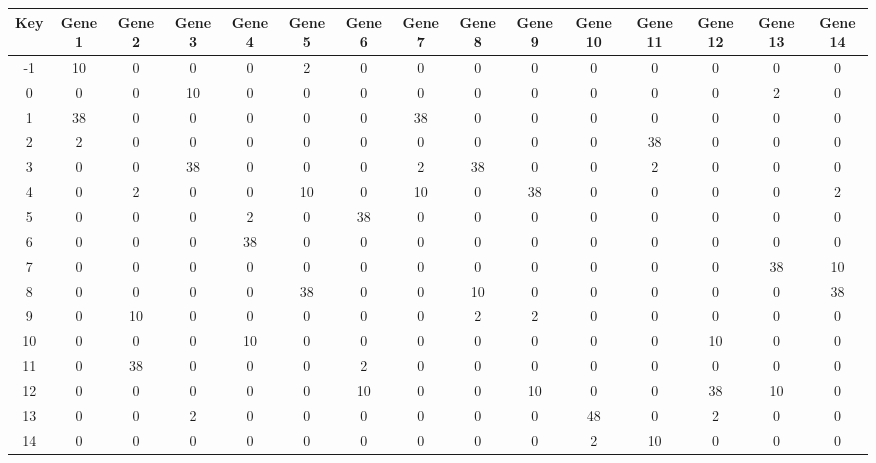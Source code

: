 \begin{tabular}{|c|c|c|c|c|c|c|c|c|c|c|c|c|c|c|}
\hline
Key & Gene 1 & Gene 2 & Gene 3 & Gene 4 & Gene 5 & Gene 6 & Gene 7 & Gene 8 & Gene 9 & Gene 10 & Gene 11 & Gene 12 & Gene 13 & Gene 14 \\
\hline
-1 & 10 & 0 & 0 & 0 & 2 & 0 & 0 & 0 & 0 & 0 & 0 & 0 & 0 & 0 \\
0 & 0 & 0 & 10 & 0 & 0 & 0 & 0 & 0 & 0 & 0 & 0 & 0 & 2 & 0 \\
1 & 38 & 0 & 0 & 0 & 0 & 0 & 38 & 0 & 0 & 0 & 0 & 0 & 0 & 0 \\
2 & 2 & 0 & 0 & 0 & 0 & 0 & 0 & 0 & 0 & 0 & 38 & 0 & 0 & 0 \\
3 & 0 & 0 & 38 & 0 & 0 & 0 & 2 & 38 & 0 & 0 & 2 & 0 & 0 & 0 \\
4 & 0 & 2 & 0 & 0 & 10 & 0 & 10 & 0 & 38 & 0 & 0 & 0 & 0 & 2 \\
5 & 0 & 0 & 0 & 2 & 0 & 38 & 0 & 0 & 0 & 0 & 0 & 0 & 0 & 0 \\
6 & 0 & 0 & 0 & 38 & 0 & 0 & 0 & 0 & 0 & 0 & 0 & 0 & 0 & 0 \\
7 & 0 & 0 & 0 & 0 & 0 & 0 & 0 & 0 & 0 & 0 & 0 & 0 & 38 & 10 \\
8 & 0 & 0 & 0 & 0 & 38 & 0 & 0 & 10 & 0 & 0 & 0 & 0 & 0 & 38 \\
9 & 0 & 10 & 0 & 0 & 0 & 0 & 0 & 2 & 2 & 0 & 0 & 0 & 0 & 0 \\
10 & 0 & 0 & 0 & 10 & 0 & 0 & 0 & 0 & 0 & 0 & 0 & 10 & 0 & 0 \\
11 & 0 & 38 & 0 & 0 & 0 & 2 & 0 & 0 & 0 & 0 & 0 & 0 & 0 & 0 \\
12 & 0 & 0 & 0 & 0 & 0 & 10 & 0 & 0 & 10 & 0 & 0 & 38 & 10 & 0 \\
13 & 0 & 0 & 2 & 0 & 0 & 0 & 0 & 0 & 0 & 48 & 0 & 2 & 0 & 0 \\
14 & 0 & 0 & 0 & 0 & 0 & 0 & 0 & 0 & 0 & 2 & 10 & 0 & 0 & 0 \\
\hline
\end{tabular}